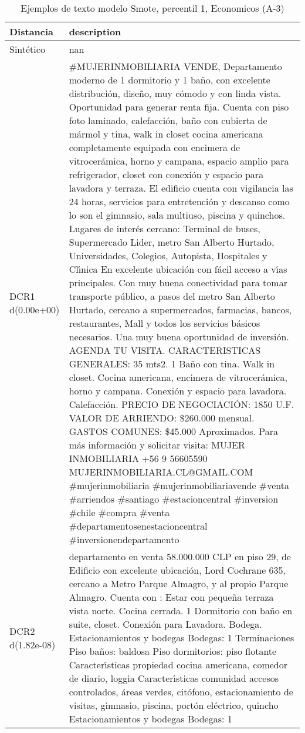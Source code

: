 \begin{table}[H]
\centering
\fontsize{10}{14}\selectfont
\caption{Ejemplos de texto modelo Smote, percentil 1, Economicos (A-3)}
\label{table-example-economicos-a-3-smote-enc-1p-text}
\begin{tabular}{|l|m{35em}|}
\hline
\rowcolor[gray]{0.8}
Distancia & description \\
\hline Sintético & nan \\
\hline DCR1 d(0.00e+00) & \#MUJERINMOBILIARIA VENDE, Departamento moderno de 1 dormitorio y 1 ba\~no, con excelente distribuci\'on, dise\~no, muy c\'omodo y con linda vista. Oportunidad para generar renta fija.  Cuenta con piso foto laminado, calefacci\'on, ba\~no con cubierta de m\'armol y tina, walk in closet cocina americana completamente equipada con encimera de vitrocer\'amica, horno y campana, espacio amplio para refrigerador, closet con conexi\'on y espacio para lavadora y terraza.  El edificio cuenta con vigilancia las 24 horas, servicios para entretenci\'on y descanso como lo son el gimnasio, sala multiuso, piscina y quinchos.  Lugares de inter\'es cercano: Terminal de buses, Supermercado Lider, metro San Alberto Hurtado, Universidades, Colegios, Autopista, Hospitales y Cl{\'\i}nica  En excelente ubicaci\'on con f\'acil acceso a v{\'\i}as principales. Con muy buena conectividad para tomar transporte p\'ublico, a pasos del metro San Alberto Hurtado, cercano a supermercados, farmacias, bancos, restaurantes, Mall y todos los servicios b\'asicos necesarios.  Una muy buena oportunidad de inversi\'on. AGENDA TU VISITA.  CARACTERISTICAS GENERALES: 35 mts2. 1 Ba\~no con tina. Walk in closet. Cocina americana, encimera de vitrocer\'amica, horno y campana. Conexi\'on y espacio para lavadora. Calefacci\'on.  PRECIO DE NEGOCIACI\'ON: 1850 U.F. VALOR DE ARRIENDO: \$260.000 mensual. GASTOS COMUNES: \$45.000 Aproximados.  Para m\'as informaci\'on y solicitar visita: MUJER INMOBILIARIA +56 9 56605590  MUJERINMOBILIARIA.CL@GMAIL.COM  \#mujerinmobiliaria \#mujerinmobiliariavende \#venta \#arriendos \#santiago \#estacioncentral \#inversion \#chile \#compra \#venta \#departamentosenestacioncentral \#inversionendepartamento \\
\hline DCR2 d(1.82e-08) & departamento en venta 58.000.000 CLP en piso 29, de Edificio con excelente ubicaci\'on, Lord Cochrane 635, cercano a Metro Parque Almagro, y al propio Parque Almagro. Cuenta con : Estar con peque\~na terraza vista norte. Cocina cerrada. 1 Dormitorio con ba\~no en suite, closet. Conexi\'on para Lavadora. Bodega.  Estacionamientos y bodegas Bodegas: 1    Terminaciones  Piso ba\~nos: baldosa Piso dormitorios: piso flotante  Caracter{\'\i}sticas propiedad  cocina americana, comedor de diario, loggia  Caracter{\'\i}sticas comunidad  accesos controlados, \'areas verdes, cit\'ofono, estacionamiento de visitas, gimnasio, piscina, port\'on el\'ectrico, quincho  Estacionamientos y bodegas   Bodegas: 1 \\
\hline
\end{tabular}
\end{table}
